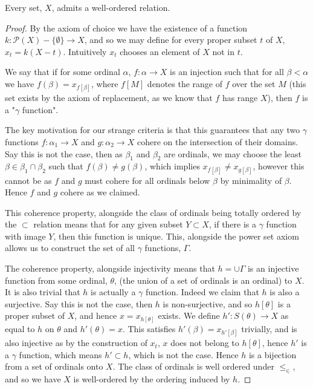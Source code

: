 \documentclass[]{article}
\begin{document}
 \begin{thm}  \label{thm:well-ordering}
 	Every set, $X$, admits a well-ordered relation.
 \end{thm}

 \begin{proof}
		 By the axiom of choice we have the existence of a function $k: \mathcal{P}(X) - \{\emptyset\} \to X$, and so we may define for every proper subset  $t$ of $X$, $x_t = k(X - t)$. Intuitively $x_t$ chooses an element of $X$ not in $t$.

		 We say that if for some ordinal $\alpha$, $f: \alpha \to X$ is an injection such that for all  $\beta < \alpha$ we have $f(\beta) = x_{f[\beta]}$, where $f[M]$ denotes the range of $f$ over the set $M$ (this set exists by the axiom of replacement, as we know that $f$ has range $X$), then $f$ is a "$\gamma$ function".

		 The key motivation for our strange criteria is that this guarantees that any two $\gamma$ functions $f: \alpha_1 \to X$ and $g: \alpha_2 \to X$ cohere on the intersection of their domains. Say this is not the case, then as  $\beta_1$ and $\beta_2$ are ordinals, we may choose the least $\beta \in \beta_1 \cap \beta_2$ such that $f(\beta) \neq g(\beta)$, which implies $x_{f[\beta]} \neq x_{g[\beta]}$, however this cannot be as $f$ and $g$ must cohere for all ordinals below $\beta$ by minimality of $\beta$. Hence $f$ and $g$ cohere as we claimed.

		 This coherence property, alongside the class of ordinals being totally ordered by the $\subset$ relation means that for any given subset $Y \subset X$, if there is a $\gamma$ function with image $Y$, then this function is unique. This, alongside the power set axiom allows us to construct the set of all $\gamma$ functions, $\Gamma$.

		 The coherence property, alongside injectivity means that  $h = \cup \Gamma$ is an injective function from some ordinal, $\theta$, (the union of a set of ordinals is an ordinal) to $X$. It is also trivial that $h$ is actually a $\gamma$ function. Indeed we claim that $h$ is also a surjective. Say this is not the case, then $h$ is non-surjective, and so $h[\theta]$ is a proper subset of $X$, and hence $x = x_{h[\theta]}$ exists. We define $h': S(\theta) \to X$ as equal to $h$ on $\theta$ and $h'(\theta) = x$. This satisfies $h'(\beta) = x_{h'[\beta]}$ trivially, and is also injective as by the construction of $x_t$, $x$ does not belong to $h[\theta]$, hence  $h'$ is a $\gamma$ function, which means $h' \subset h$, which is not the case. Hence $h$ is a bijection from a set of ordinals onto $X$. The class of ordinals is well ordered under $\leq_\in$, and so we have $X$ is well-ordered by the ordering induced by $h$.
 \end{proof}
\end{document}
